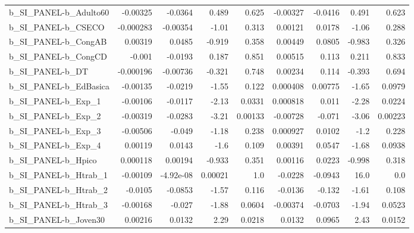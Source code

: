 \begin{tabular}{lrrrrrrrr}
b\_SI\_PANEL-b\_Adulto60      &    -0.00325 &      -0.0364 &     0.489 &    0.625 &   -0.00327 &     -0.0416 &        0.491 &         0.623 \\
b\_SI\_PANEL-b\_CSECO         &   -0.000283 &     -0.00354 &     -1.01 &    0.313 &    0.00121 &      0.0178 &        -1.06 &         0.288 \\
b\_SI\_PANEL-b\_CongAB        &     0.00319 &       0.0485 &    -0.919 &    0.358 &    0.00449 &      0.0805 &       -0.983 &         0.326 \\
b\_SI\_PANEL-b\_CongCD        &      -0.001 &      -0.0193 &     0.187 &    0.851 &    0.00515 &       0.113 &        0.211 &         0.833 \\
b\_SI\_PANEL-b\_DT            &   -0.000196 &     -0.00736 &    -0.321 &    0.748 &    0.00234 &       0.114 &       -0.393 &         0.694 \\
b\_SI\_PANEL-b\_EdBasica      &    -0.00135 &      -0.0219 &     -1.55 &    0.122 &   0.000408 &     0.00775 &        -1.65 &        0.0979 \\
b\_SI\_PANEL-b\_Exp\_1         &    -0.00106 &      -0.0117 &     -2.13 &   0.0331 &   0.000818 &       0.011 &        -2.28 &        0.0224 \\
b\_SI\_PANEL-b\_Exp\_2         &    -0.00319 &      -0.0283 &     -3.21 &  0.00133 &   -0.00728 &      -0.071 &        -3.06 &       0.00223 \\
b\_SI\_PANEL-b\_Exp\_3         &    -0.00506 &       -0.049 &     -1.18 &    0.238 &   0.000927 &      0.0102 &         -1.2 &         0.228 \\
b\_SI\_PANEL-b\_Exp\_4         &     0.00119 &       0.0143 &      -1.6 &    0.109 &    0.00391 &      0.0547 &        -1.68 &        0.0938 \\
b\_SI\_PANEL-b\_Hpico         &    0.000118 &      0.00194 &    -0.933 &    0.351 &    0.00116 &      0.0223 &       -0.998 &         0.318 \\
b\_SI\_PANEL-b\_Htrab\_1       &    -0.00109 &    -4.92e-08 &   0.00021 &      1.0 &    -0.0228 &     -0.0943 &         16.0 &           0.0 \\
b\_SI\_PANEL-b\_Htrab\_2       &     -0.0105 &      -0.0853 &     -1.57 &    0.116 &    -0.0136 &      -0.132 &        -1.61 &         0.108 \\
b\_SI\_PANEL-b\_Htrab\_3       &    -0.00168 &       -0.027 &     -1.88 &   0.0604 &   -0.00374 &     -0.0703 &        -1.94 &        0.0523 \\
b\_SI\_PANEL-b\_Joven30       &     0.00216 &       0.0132 &      2.29 &   0.0218 &     0.0132 &      0.0965 &         2.43 &        0.0152 \\

\end{tabular}
